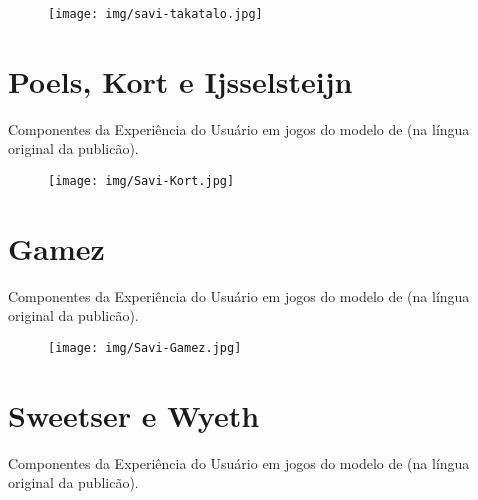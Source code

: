 \begin{figure}[h]
	\centering
	\texttt{[image: img/savi-takatalo.jpg]}
	\label{fig:anexo5}\\
\end{figure}

\newpage

\chapter{Poels, Kort e Ijsselsteijn}
\label{chap:A6}
Componentes da Experiência do Usuário em jogos do modelo de  (na língua original da publicão).

\begin{figure}[htb]
	\centering
	\texttt{[image: img/Savi-Kort.jpg]}
	\label{fig:anexo6}\\
\end{figure}

\newpage

\chapter{Gamez}
\label{chap:A7}
Componentes da Experiência do Usuário em jogos do modelo de  (na língua original da publicão).

\begin{figure}[htb]
	\centering
	\texttt{[image: img/Savi-Gamez.jpg]}
	\label{fig:anexo7}\\
\end{figure}

\newpage

\chapter{Sweetser e Wyeth}
\label{chap:A8}
Componentes da Experiência do Usuário em jogos do modelo de  (na língua original da publicão).

